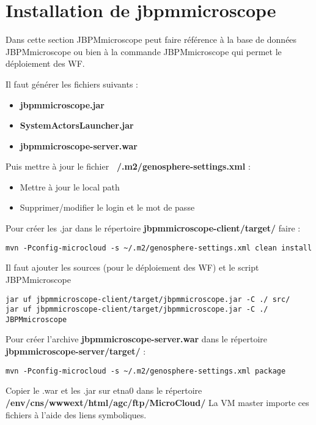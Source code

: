 \section{Installation de jbpmmicroscope}

Dans cette section JBPMmicroscope peut faire référence à la base de données JBPMmicroscope ou bien à la commande JBPMmicroscope qui permet le déploiement des WF.
\newline

Il faut générer les fichiers suivants :
\begin{itemize}
    \item \textbf{jbpmmicroscope.jar}
    \item \textbf{SystemActorsLauncher.jar}
    \item \textbf{jbpmmicroscope-server.war}
\end{itemize}
\bigskip

Puis mettre à jour le fichier \textbf{~/.m2/genosphere-settings.xml} :
\begin{itemize}
    \item  Mettre à jour le local path
    \item Supprimer/modifier le login et le mot de passe
\end{itemize}

Pour créer les .jar dans le répertoire \textbf{jbpmmicroscope-client/target/} faire :

\begin{lstlisting}[style=bash]
mvn -Pconfig-microcloud -s ~/.m2/genosphere-settings.xml clean install
\end{lstlisting}
\bigskip

Il faut ajouter les sources (pour le déploiement des WF) et le script JBPMmicroscope
\begin{lstlisting}[style=bash]
jar uf jbpmmicroscope-client/target/jbpmmicroscope.jar -C ./ src/
jar uf jbpmmicroscope-client/target/jbpmmicroscope.jar -C ./ JBPMmicroscope
\end{lstlisting}
\bigskip

Pour créer l'archive \textbf{jbpmmicroscope-server.war} dans le répertoire \textbf{jbpmmicroscope-server/target/} :
\begin{lstlisting}[style=bash]
mvn -Pconfig-microcloud -s ~/.m2/genosphere-settings.xml package
\end{lstlisting}
\bigskip

Copier le .war et les .jar sur etna0 dans le répertoire \textbf{/env/cns/wwwext/html/agc/ftp/MicroCloud/}
La VM master importe ces fichiers à l’aide des liens symboliques.
\newline

